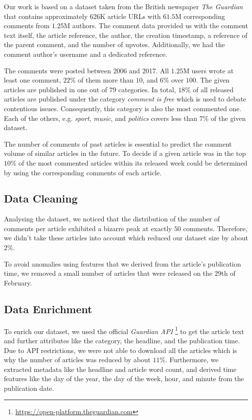 Our work is based on a dataset taken from the British newspaper \textit{The Guardian} that contains approximately $626$K article URLs with $61.5$M corresponding comments from $1.25$M authors.
The comment data provided us with the comment text itself, the article reference, the author, the creation timestamp, a reference of the parent comment, and the number of upvotes. Additionally, we had the comment author's username and a dedicated reference.

The comments were posted between 2006 and 2017. All $1.25$M users wrote at least one comment, $22$\% of them more than $10$, and $6$\% over $100$.
The given articles are published in one out of $79$ categories. In total, $18$\% of all released articles are published under the category \textit{comment is free} which is used to debate contentious issues. Consequently, this category is also the most commented one. 
Each of the others, e.g. \textit{sport}, \textit{music}, and \textit{politics} covers less than $7$\% of the given dataset.

The number of comments of past articles is essential to predict the comment volume of similar articles in the future. 
To decide if a given article was in the top $10$\% of the most commented articles within its released week could be determined by using the corresponding comments of each article.

\subsection{Data Cleaning}
Analysing the dataset, we noticed that the distribution of the number of comments per article exhibited a bizarre peak at exactly $50$ comments. Therefore, we didn't take these articles into account which reduced our dataset size by about $2$\%.

To avoid anomalies using features that we derived from the article's publication time, we removed a small number of articles that were released on the 29th of February.

\subsection{Data Enrichment}
To enrich our dataset, we used the official \textit{Guardian API} \footnote{\url{https://open-platform.theguardian.com}} to get the article text and further attributes like the category, the headline, and the publication time.
Due to API restrictions, we were not able to download all the articles which is why the number of articles was reduced by about $11$\%.
Furthermore, we extracted metadata like the headline and article word count, and derived time features like the day of the year, the day of the week, hour, and minute from the publication date.

